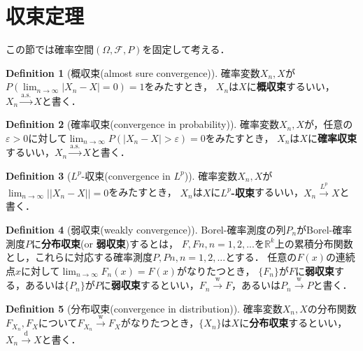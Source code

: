 \documentclass[a4paper,10pt]{jsarticle}
\theoremstyle{definition}
\newtheorem{definition}{Definition}
\begin{document}
\section{収束定理}
この節では確率空間$(\Omega,\mathcal{F},P)$を固定して考える．
\begin{definition}[概収束(almost sure convergence)]
確率変数$X_n,X$が$P\left(\displaystyle\lim_{n\rightarrow\infty}\left|X_n-X\right|=0\right)=1$をみたすとき，
$X_n$は$X$に\textbf{概収束}するいい，$X_n\overset{\text{a.s.}}{\rightarrow}X$と書く．
\end{definition}\begin{definition}[確率収束(convergence in probability)]
確率変数$X_n,X$が，任意の$\varepsilon>0$に対して$\displaystyle\lim_{n\rightarrow\infty}P\left(\left|X_n-X\right|>\varepsilon\right)=0$をみたすとき，
$X_n$は$X$に\textbf{確率収束}するいい，$X_n\overset{\text{a.s.}}{\rightarrow}X$と書く．
\end{definition}\begin{definition}[$L^p$-収束(convergence in $L^p$)]
確率変数$X_n,X$が$\displaystyle \lim_{n\rightarrow\infty}\left||X_n-X\right||=0$をみたすとき，
$X_n$は$X$に\textbf{$L^p$-収束}するいい，$X_n\overset{L^p}{\rightarrow}X$と書く．
\end{definition}\begin{definition}[弱収束(weakly convergence)]
Borel-確率測度の列$P_n$がBorel-確率測度$P$に\textbf{分布収束}(or \textbf{弱収束})するとは，
$F, Fn, n = 1, 2, ...$を$\mathbb{R}^k$上の累積分布関数とし，これらに対応する確率測度$P, Pn, n = 1,2,...$とする．
任意の$F(x)$の連続点$x$に対して$\displaystyle\lim_{n\rightarrow\infty}F_n(x)=F(x)$がなりたつとき，
$\{F_n\}$が$F$に\textbf{弱収束}する，あるいは$\{P_n\}$が$P$に\textbf{弱収束}するといい，$F_n\overset{\text{w}}{\rightarrow}F$，あるいは$P_n\overset{\text{w}}{\rightarrow}P$と書く．
\end{definition}\begin{definition}[分布収束(convergence in distribution)]
確率変数$X_n,X$の分布関数$F_{X_n},F_X$について$F_{X_n}\overset{\text{w}}{\rightarrow}F_X$がなりたつとき，$\{X_n\}$は$X$に\textbf{分布収束}するといい，$X_n\overset{\text{d}}{\rightarrow}X$と書く．
\end{definition}
\end{document}
